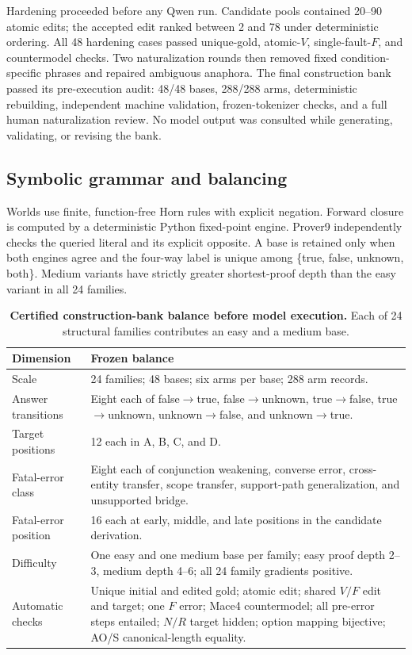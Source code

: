 \documentclass[letterpaper]{article}
\begin{document}
Hardening proceeded before any Qwen run.  Candidate pools contained 20--90 atomic edits; the accepted edit ranked between 2 and 78 under deterministic ordering.  All 48 hardening cases passed unique-gold, atomic-$V$, single-fault-$F$, and countermodel checks.  Two naturalization rounds then removed fixed condition-specific phrases and repaired ambiguous anaphora.  The final construction bank passed its pre-execution audit: 48/48 bases, 288/288 arms, deterministic rebuilding, independent machine validation, frozen-tokenizer checks, and a full human naturalization review.  No model output was consulted while generating, validating, or revising the bank.

\subsection{Symbolic grammar and balancing}

Worlds use finite, function-free Horn rules with explicit negation.  Forward closure is computed by a deterministic Python fixed-point engine.  Prover9 independently checks the queried literal and its explicit opposite.  A base is retained only when both engines agree and the four-way label is unique among \{true, false, unknown, both\}.  Medium variants have strictly greater shortest-proof depth than the easy variant in all 24 families.

\begin{table}[t]
\centering
\small
\begin{tabular}{L{3.0cm}L{10.7cm}}
\toprule
Dimension & Frozen balance \\
\midrule
Scale & 24 families; 48 bases; six arms per base; 288 arm records. \\
Answer transitions & Eight each of false$\rightarrow$true, false$\rightarrow$unknown, true$\rightarrow$false, true$\rightarrow$unknown, unknown$\rightarrow$false, and unknown$\rightarrow$true. \\
Target positions & 12 each in A, B, C, and D. \\
Fatal-error class & Eight each of conjunction weakening, converse error, cross-entity transfer, scope transfer, support-path generalization, and unsupported bridge. \\
Fatal-error position & 16 each at early, middle, and late positions in the candidate derivation. \\
Difficulty & One easy and one medium base per family; easy proof depth 2--3, medium depth 4--6; all 24 family gradients positive. \\
Automatic checks & Unique initial and edited gold; atomic edit; shared $V/F$ edit and target; one $F$ error; Mace4 countermodel; all pre-error steps entailed; $N/R$ target hidden; option mapping bijective; AO/S canonical-length equality. \\
\bottomrule
\end{tabular}
\caption{\textbf{Certified construction-bank balance before model execution.} Each of 24 structural families contributes an easy and a medium base.}
\label{tab:supp-data-balance}
\end{table}
\end{document}
